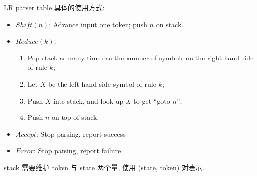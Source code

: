 LR parser table 具体的使用方式:
\begin{itemize}
    \item $Shift(n)$: Advance input one token; push $n$ on stack.
    \item $Reduce(k)$:
    \begin{enumerate}
        \item Pop stack as many times as the number of symbols on the right-hand side of rule $k$;
        \item Let $X$ be the left-hand-side symbol of rule $k$;
        \item Push $X$ into stack, and look up $X$ to get ``goto $n$''; 
        \item Push $n$ on top of stack.
    \end{enumerate}
    \item $Accept$: Stop parsing, report success
    \item $Error$: Stop parsing, report failure
\end{itemize}

stack 需要维护 token 与 state 两个量, 使用 (state, token) 对表示. 


    

